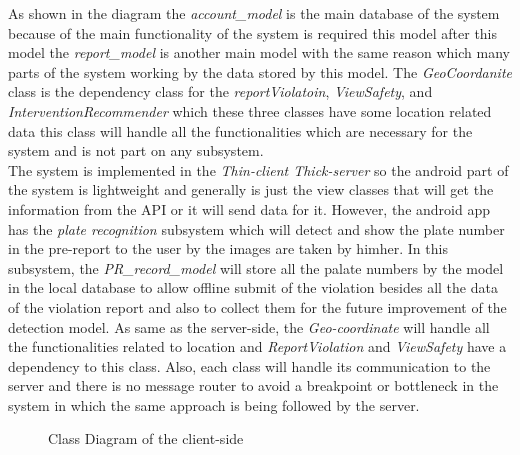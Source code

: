 As shown in the diagram the  \emph{account\_model} is the main database of the system because of the main functionality of the system is required this model after this model the  \emph{report\_model} is another main model with the same reason which many parts of the system working by the data stored by this model. The  \emph{GeoCoordanite} class is the dependency class for the  \emph{reportViolatoin},  \emph{ViewSafety}, and  \emph{InterventionRecommender} which these three classes have some location related data this class will handle all the functionalities which are necessary for the system and is not part on any subsystem.\\
The system is implemented in the  \emph{Thin-client\/ Thick-server} so the android part of the system is lightweight and generally is just the view classes that will get the information from the API or it will send data for it. However, the android app has the  \emph{plate recognition} subsystem which will detect and show the plate number in the pre-report to the user by the images are taken by him\/her.  In this subsystem, the  \emph{PR\_record\_model} will store all the palate numbers by the model in the local database to allow offline submit of the violation besides all the data of the violation report and also to collect them for the future improvement of the detection model. As same as the server-side, the  \emph{Geo-coordinate} will handle all the functionalities related to location and  \emph{ReportViolation} and  \emph{ViewSafety} have a dependency to this class. Also, each class will handle its communication to the server and there is no message router to avoid a breakpoint or bottleneck in the system in which the same approach is being followed by the server.\\


\begin{sidewaysfigure}
\begin{figure}[H]
\caption{Class Diagram of the client-side}
\label{fig:Class-client}
\centering

\end{figure}
\end{sidewaysfigure}
